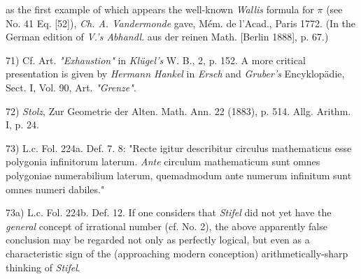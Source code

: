 \vfill
\leftline{\rule{2in}{0.4pt}}
\vspace{0.2cm}
{
\footnotesize
as the first example of which appears the well-known \textit{Wallis} formula for $\pi$ (see No. 41 Eq. [52]), \textit{Ch. A. Vandermonde} gave, Mém. de l'Acad., Paris 1772. (In the German edition of \textit{V.'s Abhandl}. aus der reinen Math. [Berlin 1888], p. 67.)

71) Cf. Art. \textit{"Exhaustion"} in \textit{Klügel's} W. B., 2, p. 152. A more critical presentation is given by \textit{Hermann Hankel} in \textit{Ersch} and \textit{Gruber's} Encyklopädie, Sect. I, Vol. 90, Art. \textit{"Grenze"}.

72) \textit{Stolz}, Zur Geometrie der Alten. Math. Ann. 22 (1883), p. 514. Allg. Arithm. I, p. 24.

73) L.c. Fol. 224a. Def. 7. 8: "Recte igitur describitur circulus mathematicus esse polygonia infinitorum laterum. \textit{Ante} circulum mathematicum sunt omnes polygoniae numerabilium laterum, quemadmodum ante numerum infinitum sunt omnes numeri dabiles."

73a) L.c. Fol. 224b. Def. 12. If one considers that \textit{Stifel} did not yet have the \textit{general} concept of irrational number (cf. No. 2), the above apparently false conclusion may be regarded not only as perfectly logical, but even as a characteristic sign of the (approaching modern conception) arithmetically-sharp thinking of \textit{Stifel}. 

}